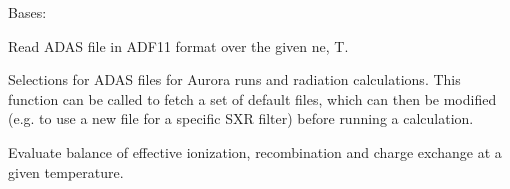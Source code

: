 \documentclass[letterpaper,10pt,english]{sphinxmanual}
\begin{document}
\begin{fulllineitems}
\label{\detokenize{aurora:aurora.atomic.adas_file}}
Bases: 

Read ADAS file in ADF11 format over the given ne, T.

\begin{fulllineitems}
\label{\detokenize{aurora:aurora.atomic.adas_file.load}}
\end{fulllineitems}


\begin{fulllineitems}
\label{\detokenize{aurora:aurora.atomic.adas_file.plot}}
\end{fulllineitems}


\end{fulllineitems}


\begin{fulllineitems}
\label{\detokenize{aurora:aurora.atomic.adas_files_dict}}
Selections for ADAS files for Aurora runs and radiation calculations.
This function can be called to fetch a set of default files, which can then be modified (e.g. to 
use a new file for a specific SXR filter) before running a calculation.

\end{fulllineitems}


\begin{fulllineitems}
\label{\detokenize{aurora:aurora.atomic.balance}}
Evaluate balance of effective ionization, recombination and charge exchange at a given temperature.

\end{fulllineitems}
\end{document}
